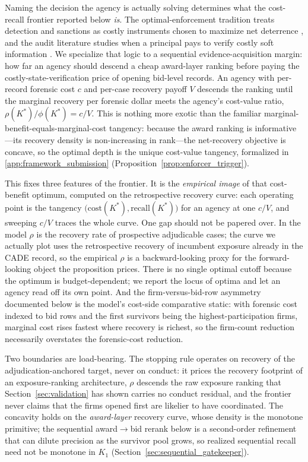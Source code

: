 Naming the decision the agency is actually solving determines what the
cost-recall frontier reported below \emph{is}. The optimal-enforcement
tradition treats detection and sanctions as costly instruments chosen
to maximize net deterrence \citep{becker1968crime,polinsky2000economic},
and the audit literature studies when a principal pays to verify costly
soft information \citep{townsend1979optimal,mookherjee1989optimal}. We
specialize that logic to a sequential evidence-acquisition margin: how
far an agency should descend a cheap award-layer ranking before paying
the costly-state-verification price of opening bid-level records.
An agency with per-record forensic cost $c$ and per-case recovery
payoff $V$ descends the ranking until the marginal recovery per
forensic dollar meets the agency's cost-value ratio,
$\rho(K^{*})/\phi(K^{*}) = c/V$. This is nothing more exotic than the
familiar marginal-benefit-equals-marginal-cost tangency: because the
award ranking is informative---its recovery density is non-increasing
in rank---the net-recovery objective is concave, so the optimal depth
is the unique cost-value tangency, formalized in
\ref{app:framework_submission}
(Proposition~\ref{prop:enforcer_trigger}).

This fixes three features of the frontier. It is the \emph{empirical
image} of that cost-benefit optimum, computed on the retrospective
recovery curve: each operating point is the tangency
$\bigl(\text{cost}(K^{*}),\text{recall}(K^{*})\bigr)$ for an agency at
one $c/V$, and sweeping $c/V$ traces the whole curve. One gap should
not be papered over. In the model $\rho$ is the recovery rate of
prospective adjudicable cases; the curve we actually plot uses the
retrospective recovery of incumbent exposure already in the CADE
record, so the empirical $\rho$ is a backward-looking proxy for the
forward-looking object the proposition prices. There is no single
optimal cutoff because the optimum is budget-dependent; we report the
locus of optima and let an agency read off its own point. And the firm-versus-bid-row asymmetry documented
below is the model's cost-side comparative static: with forensic cost
indexed to bid rows and the first survivors being the
highest-participation firms, marginal cost rises fastest where recovery
is richest, so the firm-count reduction necessarily overstates the
forensic-cost reduction.

Two boundaries are load-bearing. The stopping rule operates on recovery
of the adjudication-anchored target, never on conduct: it prices the
recovery footprint of an exposure-ranking architecture, $\rho$ descends
the raw exposure ranking that Section~\ref{sec:validation} has shown
carries no conduct residual, and the frontier never claims that the
firms opened first are likelier to have coordinated. The concavity
holds on the \emph{award-layer} recovery curve, whose density is the
monotone primitive; the sequential award$\rightarrow$bid rerank below is
a second-order refinement that can dilute precision as the survivor pool
grows, so realized sequential recall need not be monotone in $K_1$
(Section~\ref{sec:sequential_gatekeeper}).

